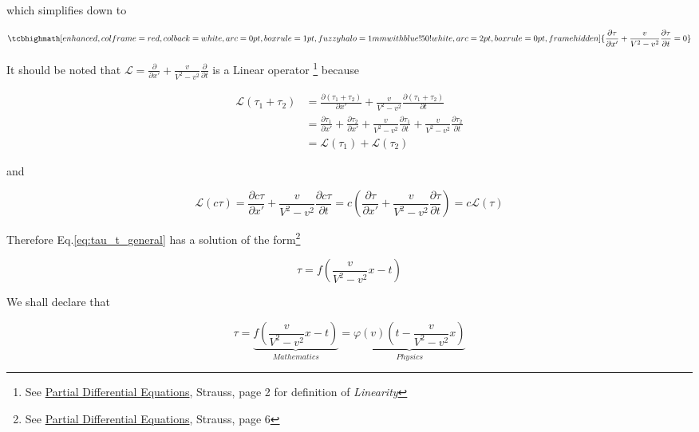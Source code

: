 which simplifies down to

\begin{equation}\label{eq:tau_t_general}
    \tcbhighmath[
        enhanced,colframe=red,colback=white,arc=0pt,boxrule=1pt,
        fuzzy halo=1mm with blue!50!white,
        arc=2pt,
        boxrule=0pt,
        frame hidden
    ]{
        \frac{\partial\tau}{\partial x'} + \frac{v}{V^2 - v^2}\frac{\partial\tau}{\partial t} = 0
    }
\end{equation}

It should be noted that $\mathscr{L} = \frac{\partial}{\partial x'} + \frac{v}{V^2 - v^2}\frac{\partial}{\partial t}$
is a Linear operator
\footnote{See \href{https://trello.com/c/5L46ePJQ}{Partial Differential Equations}, Strauss, page 2 for definition of \textit{Linearity}}
because

\begin{align}
    \mathscr{L}(\tau_1 + \tau_2) &= \frac{\partial(\tau_1 + \tau_2)}{\partial x'} + \frac{v}{V^2 - v^2}\frac{\partial(\tau_1 + \tau_2)}{\partial t} \\
    &= \frac{\partial\tau_1}{\partial x'} + \frac{\partial\tau_2}{\partial x'} + \frac{v}{V^2 - v^2}\frac{\partial\tau_1}{\partial t} + \frac{v}{V^2 - v^2}\frac{\partial\tau_2}{\partial t} \\
    &= \mathscr{L}(\tau_1) + \mathscr{L}(\tau_2)
\end{align}

and

\begin{equation}
    \mathscr{L}(c\tau) = \frac{\partial c\tau}{\partial x'} + \frac{v}{V^2 - v^2}\frac{\partial c\tau}{\partial t} = c\left( \frac{\partial\tau}{\partial x'} + \frac{v}{V^2 - v^2}\frac{\partial\tau}{\partial t} \right) = c\mathscr{L}(\tau)
\end{equation}

Therefore Eq.\ref{eq:tau_t_general} has a solution of the form\footnote{See \href{https://trello.com/c/5L46ePJQ}{Partial Differential Equations}, Strauss, page 6}

\begin{equation}
    \tau = f\left( \frac{v}{V^2 - v^2} x - t \right)
\end{equation}

We shall declare that

\begin{equation}\label{eq:transformation}
    \tau = \underbrace{f\left( \frac{v}{V^2 - v^2} x - t \right)}_{Mathematics} = \underbrace{\varphi(v)\left( t - \frac{v}{V^2 - v^2} x \right)}_{Physics}
\end{equation}

